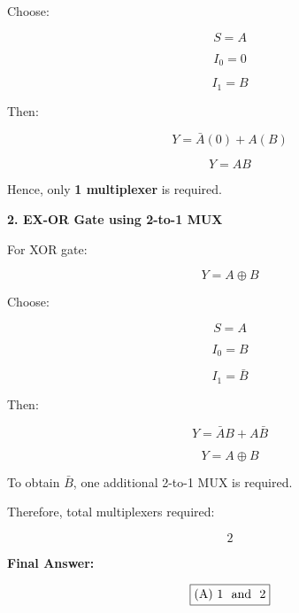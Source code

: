 \documentclass[12pt]{article}
\begin{document}
Choose:

\[
S = A
\]

\[
I_0 = 0
\]

\[
I_1 = B
\]

Then:

\[
Y = \bar{A}(0) + A(B)
\]

\[
Y = AB
\]

Hence, only \textbf{1 multiplexer} is required.

\vspace{0.5cm}

\noindent
\textbf{2. EX-OR Gate using 2-to-1 MUX}

For XOR gate:

\[
Y = A \oplus B
\]

Choose:

\[
S = A
\]

\[
I_0 = B
\]

\[
I_1 = \bar{B}
\]

Then:

\[
Y = \bar{A}B + A\bar{B}
\]

\[
Y = A \oplus B
\]

To obtain $\bar{B}$, one additional 2-to-1 MUX is required.

Therefore, total multiplexers required:

\[
2
\]

\vspace{0.5cm}

\noindent
\textbf{Final Answer:}

\[
\boxed{\text{(A) 1 \text{ and } 2}}
\]
\end{document}
